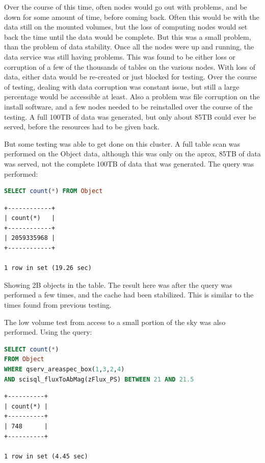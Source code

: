 \documentclass[DM,toc]{lsstdoc}
\begin{document}
Over the course of this time, often nodes would go out with problems,
and be down for some amount of time, before coming back. Often this
would be with the data still on the mounted volumes, but the loss of
computing nodes would set back the time until the data would be
complete. But this was a small problem, than the problem of data
stability. Once all the nodes were up and running, the data service was
still having problems. This was found to be either loss or corruption of
a few of the thousands of tables on the various nodes. With loss of
data, either data would be re-created or just blocked for testing. Over
the course of testing, dealing with data corruption was constant issue,
but still a large percentage would be accessible at least. Also a
problem was file corruption on the install software, and a few nodes
needed to be reinstalled over the course of the testing. A full 100TB of
data was generated, but only about 85TB could ever be served, before the
resources had to be given back.

But some testing was able to get done on this cluster. A full table scan
was performed on the Object data, although this was only on the aprox,
85TB of data was served, not the complete 100TB of data that was
generated. The query was performed:

\begin{lstlisting}[language=SQL]
SELECT count(*) FROM Object
\end{lstlisting}

\begin{verbatim}
+------------+
| count(*)   |
+------------+
| 2059335968 |
+------------+

1 row in set (19.26 sec)
\end{verbatim}

Showing 2B objects in the table. The result here was after the query was
performed a few times, and the cache had been stabilized. This is
similar to the times found from previous testing.

The low volume test from access to a small portion of the sky was also
performed. Using the query:

\begin{lstlisting}[language=SQL]
SELECT count(*)
FROM Object
WHERE qserv_areaspec_box(1,3,2,4)
AND scisql_fluxToAbMag(zFlux_PS) BETWEEN 21 AND 21.5
\end{lstlisting}

\begin{verbatim}
+----------+
| count(*) |
+----------+
| 748      |
+----------+

1 row in set (4.45 sec)
\end{verbatim}
\end{document}
